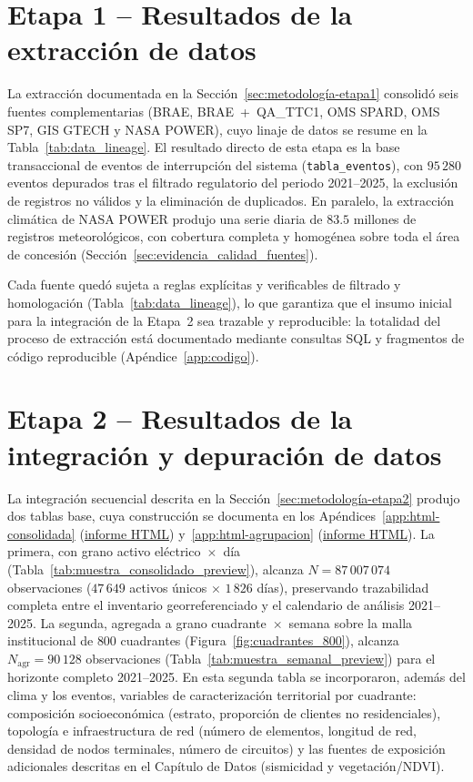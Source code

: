 


\section{Etapa 1 – Resultados de la extracción de datos}
\label{sec:resultados-etapa1}

La extracción documentada en la Sección~\ref{sec:metodología-etapa1} consolidó seis fuentes complementarias (BRAE, BRAE~+~QA\_TTC1, OMS SPARD, OMS SP7, GIS GTECH y NASA POWER), cuyo linaje de datos se resume en la Tabla~\ref{tab:data_lineage}. El resultado directo de esta etapa es la base transaccional de eventos de interrupción del sistema (\texttt{tabla\_eventos}), con $95\,280$ eventos depurados tras el filtrado regulatorio del periodo 2021--2025, la exclusión de registros no válidos y la eliminación de duplicados. En paralelo, la extracción climática de NASA POWER produjo una serie diaria de $83{.}5$ millones de registros meteorológicos, con cobertura completa y homogénea sobre toda el área de concesión (Sección~\ref{sec:evidencia_calidad_fuentes}).

Cada fuente quedó sujeta a reglas explícitas y verificables de filtrado y homologación (Tabla~\ref{tab:data_lineage}), lo que garantiza que el insumo inicial para la integración de la Etapa~2 sea trazable y reproducible: la totalidad del proceso de extracción está documentado mediante consultas SQL y fragmentos de código reproducible (Apéndice~\ref{app:codigo}).


\section{Etapa 2 – Resultados de la integración y depuración de datos}
\label{sec:resultados-etapa2}

La integración secuencial descrita en la Sección~\ref{sec:metodología-etapa2} produjo dos tablas base, cuya construcción se documenta en los Apéndices~\ref{app:html-consolidada} (\href{\urlconsolidada}{informe HTML}) y~\ref{app:html-agrupacion} (\href{\urlagrupacion}{informe HTML}). La primera, con grano activo eléctrico~$\times$~día (Tabla~\ref{tab:muestra_consolidado_preview}), alcanza $N = 87\,007\,074$ observaciones ($47\,649$ activos únicos $\times$ $1\,826$ días), preservando trazabilidad completa entre el inventario georreferenciado y el calendario de análisis 2021--2025. La segunda, agregada a grano cuadrante~$\times$~semana sobre la malla institucional de $800$ cuadrantes (Figura~\ref{fig:cuadrantes_800}), alcanza $N_{\mathrm{agr}} = 90\,128$ observaciones (Tabla~\ref{tab:muestra_semanal_preview}) para el horizonte completo 2021--2025. En esta segunda tabla se incorporaron, además del clima y los eventos, variables de caracterización territorial por cuadrante: composición socioeconómica (estrato, proporción de clientes no residenciales), topología e infraestructura de red (número de elementos, longitud de red, densidad de nodos terminales, número de circuitos) y las fuentes de exposición adicionales descritas en el Capítulo de Datos (sismicidad y vegetación/NDVI).

